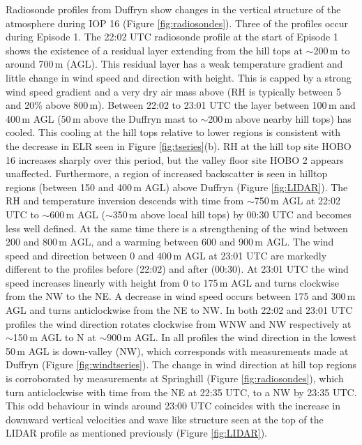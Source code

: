 \documentclass[times]{qjrms4}
\begin{document}
Radiosonde profiles from Duffryn show changes in the vertical structure of the atmosphere during IOP 16 (Figure \ref{fig:radiosondes}). Three of the profiles occur during Episode 1. The 22:02 UTC radiosonde profile at the start of Episode 1 shows the existence of a residual layer extending from the hill tops at $\sim$200$\,\mbox{m}$ to around 700$\,\mbox{m}$ (AGL). This residual layer has a weak temperature gradient and little change in wind speed and direction with height. This is capped by a strong wind speed gradient and a very dry air mass above (RH is typically between 5 and 20\% above 800$\,\mbox{m}$). Between 22:02 to 23:01 UTC the layer between 100$\,\mbox{m}$ and 400$\,\mbox{m}$ AGL (50$\,\mbox{m}$ above the Duffryn mast to $\sim$200$\,\mbox{m}$ above nearby hill tops) has cooled. This cooling at the hill tops relative to lower regions is consistent with the decrease in ELR seen in Figure \ref{fig:tseries}(b). RH at the hill top site HOBO 16 increases sharply over this period, but the valley floor site HOBO 2 appears unaffected. Furthermore, a region of increased backscatter is seen in hilltop regions (between 150 and 400$\,\mbox{m}$ AGL) above Duffryn (Figure \ref{fig:LIDAR}). The RH and temperature inversion descends with time from $\sim$750$\,\mbox{m}$ AGL at 22:02 UTC to $\sim$600$\,\mbox{m}$ AGL ($\sim$350$\,\mbox{m}$ above local hill tops) by 00:30 UTC and becomes less well defined. At the same time there is a strengthening of the wind between 200 and 800$\,\mbox{m}$ AGL, and a warming between 600 and 900$\,\mbox{m}$ AGL. The wind speed and direction between 0 and 400$\,\mbox{m}$ AGL at 23:01 UTC are markedly different to the profiles before (22:02) and after (00:30). At 23:01 UTC the wind speed increases linearly with height from 0 to 175$\,\mbox{m}$ AGL and turns clockwise from the NW to the NE. A decrease in wind speed occurs between 175 and 300$\,\mbox{m}$ AGL and turns anticlockwise from the NE to NW. In both 22:02 and 23:01 UTC profiles the wind direction rotates clockwise from WNW and NW respectively at $\sim$150$\,\mbox{m}$ AGL to N at $\sim$900$\,\mbox{m}$ AGL. In all profiles the wind direction in the lowest 50$\,\mbox{m}$ AGL is down-valley (NW), which corresponds with measurements made at Duffryn (Figure \ref{fig:windtseries}). The change in wind direction at hill top regions is corroborated by measurements at Springhill (Figure \ref{fig:radiosondes}), which turn anticlockwise with time from the NE at 22:35 UTC, to a NW by 23:35 UTC. This odd behaviour in winds around 23:00 UTC coincides with the increase in downward vertical velocities and wave like structure seen at the top of the LIDAR profile as mentioned previously (Figure \ref{fig:LIDAR}).
\end{document}
